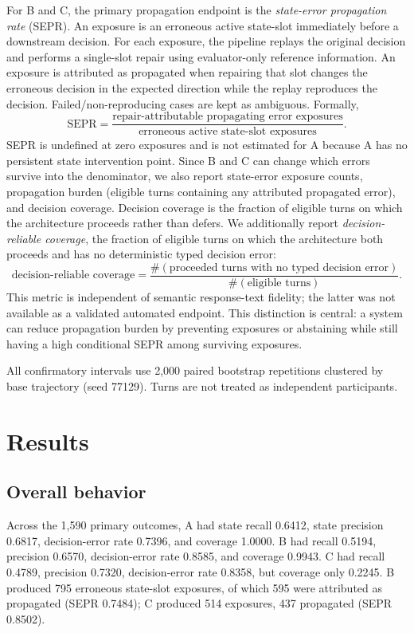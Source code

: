 \documentclass[10pt]{article}
\newcommand{\sepr}{\mathrm{SEPR}}
\begin{document}
For B and C, the primary propagation endpoint is the \emph{state-error propagation rate} (SEPR). An exposure is an erroneous active state-slot immediately before a downstream decision. For each exposure, the pipeline replays the original decision and performs a single-slot repair using evaluator-only reference information. An exposure is attributed as propagated when repairing that slot changes the erroneous decision in the expected direction while the replay reproduces the decision. Failed/non-reproducing cases are kept as ambiguous. Formally,
\[
\sepr = \frac{\text{repair-attributable propagating error exposures}}{\text{erroneous active state-slot exposures}}.
\]
SEPR is undefined at zero exposures and is not estimated for A because A has no persistent state intervention point. Since B and C can change which errors survive into the denominator, we also report state-error exposure counts, propagation burden (eligible turns containing any attributed propagated error), and decision coverage. Decision coverage is the fraction of eligible turns on which the architecture proceeds rather than defers. We additionally report \emph{decision-reliable coverage}, the fraction of eligible turns on which the architecture both proceeds and has no deterministic typed decision error:
\[
\text{decision-reliable coverage}=\frac{\#(\text{proceeded turns with no typed decision error})}{\#(\text{eligible turns})}.
\]
This metric is independent of semantic response-text fidelity; the latter was not available as a validated automated endpoint. This distinction is central: a system can reduce propagation burden by preventing exposures or abstaining while still having a high conditional SEPR among surviving exposures.

All confirmatory intervals use 2,000 paired bootstrap repetitions clustered by base trajectory (seed 77129). Turns are not treated as independent participants.

\section{Results}
\subsection{Overall behavior}
Across the 1,590 primary outcomes, A had state recall 0.6412, state precision 0.6817, decision-error rate 0.7396, and coverage 1.0000. B had recall 0.5194, precision 0.6570, decision-error rate 0.8585, and coverage 0.9943. C had recall 0.4789, precision 0.7320, decision-error rate 0.8358, but coverage only 0.2245. B produced 795 erroneous state-slot exposures, of which 595 were attributed as propagated (SEPR 0.7484); C produced 514 exposures, 437 propagated (SEPR 0.8502).
\end{document}
